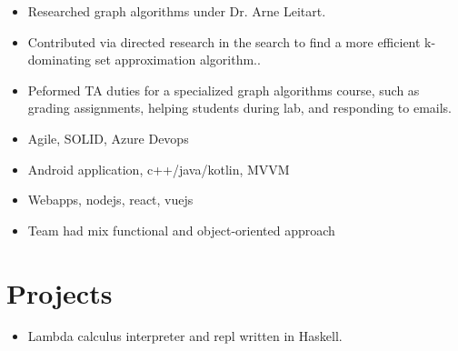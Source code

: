\documentclass[11pt, a4paper]{article}
\begin{document}
\noindent
{
  \hfill
  \hfill
}
\vspace{-0.1in}
\begin{itemize}
  \item Researched graph algorithms under Dr. Arne Leitart.
        \vspace{-0.1in}
  \item Contributed via directed research in the search to find a more efficient k-dominating set approximation algorithm..
        \vspace{-0.1in}
  \item Peformed TA duties for a specialized graph algorithms course, such as grading assignments, helping students during lab, and responding to emails.
\end{itemize}
\vspace{-0.05in}

\noindent
{
  \hfill
  \hfill
}
\vspace{-0.1in}
\begin{itemize}
  \item Agile, SOLID, Azure Devops
        \vspace{-0.1in}
  \item Android application, c++/java/kotlin, MVVM
        \vspace{-0.1in}
  \item Webapps, nodejs, react, vuejs
        \vspace{-0.1in}
  \item Team had mix functional and object-oriented approach
\end{itemize}
\vspace{-0.2in}

\section*{Projects}
\noindent
{
  \hfill
}
\vspace{-0.1in}
\begin{itemize}
  \item Lambda calculus interpreter and repl written in Haskell.
\end{itemize}
\vspace{-0.05in}
\end{document}
